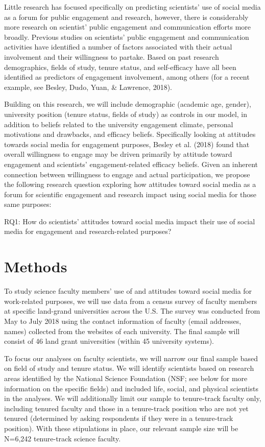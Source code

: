 \documentclass[12pt,]{article}
\begin{document}
Little research has focused specifically on predicting scientists' use of social media as a forum for public engagement and research, however, there is considerably more research on scientist' public engagement and communication efforts more broadly. Previous studies on scientists' public engagement and communication activities have identified a number of factors associated with their actual involvement and their willingness to partake. Based on past research demographics, fields of study, tenure status, and self-efficacy have all been identified as predictors of engagement involvement, among others (for a recent example, see Besley, Dudo, Yuan, \& Lawrence, 2018).

Building on this research, we will include demographic (academic age, gender), university position (tenure status, fields of study) as controls in our model, in addition to beliefs related to the university engagement climate, personal motivations and drawbacks, and efficacy beliefs. Specifically looking at attitudes towards social media for engagement purposes, Besley et al. (2018) found that overall willingness to engage may be driven primarily by attitude toward engagement and scientists' engagement-related efficacy beliefs. Given an inherent connection between willingness to engage and actual participation, we propose the following research question exploring how attitudes toward social media as a forum for scientific engagement and research impact using social media for those same purposes:

RQ1: How do scientists' attitudes toward social media impact their use of social media for engagement and research-related purposes?

\hypertarget{methods}{%
\section{Methods}\label{methods}}

To study science faculty members' use of and attitudes toward social media for work-related purposes, we will use data from a census survey of faculty members at specific land-grand universities across the U.S. The survey was conducted from May to July 2018 using the contact information of faculty (email addresses, names) collected from the websites of each university. The final sample will consist of 46 land grant universities (within 45 university systems).

To focus our analyses on faculty scientists, we will narrow our final sample based on field of study and tenure status. We will identify scientists based on research areas identified by the National Science Foundation (NSF; see below for more information on the specific fields) and included life, social, and physical scientists in the analyses. We will additionally limit our sample to tenure-track faculty only, including tenured faculty and those in a tenure-track position who are not yet tenured (determined by asking respondents if they were in a tenure-track position). With these stipulations in place, our relevant sample size will be N=6,242 tenure-track science faculty.
\end{document}
